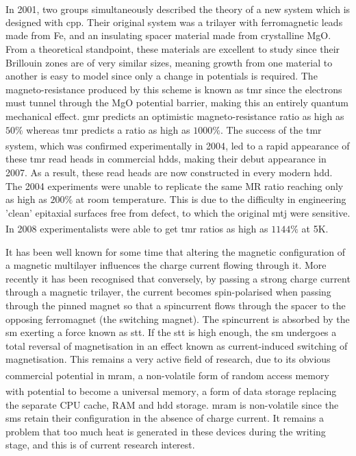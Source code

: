\documentclass[a4paper, 12pt]{article}
\newcommand{\site}[1]{\textsuperscript{\textcolor{blue}{\cite{#1}}}}
\begin{document}
	\\\par In 2001, two groups simultaneously described the theory of a new system\textsuperscript{\textcolor{blue}{\cite{tunnel1,tunnel2}}} which is designed with \gls{cpp}. Their original system was a trilayer with ferromagnetic leads made from Fe, and an insulating spacer material made from crystalline MgO. From a theoretical standpoint, these materials are excellent to study since their Brillouin zones are of very similar sizes, meaning growth from one material to another is easy to model since only a change in potentials is required. The magneto-resistance produced by this scheme is known as \gls{tmr} since the electrons must tunnel through the MgO potential barrier, making this an entirely quantum mechanical effect. \gls{gmr} predicts an optimistic magneto-resistance ratio as high as $50\%$ whereas \gls{tmr} predicts a ratio as high as $1000\%$.
	The success of the \gls{tmr} system, which was confirmed experimentally in 2004\textsuperscript{\textcolor{blue}{\cite{2004,2004P}}}, led to a rapid appearance of these \gls{tmr} read heads in commercial \gls{hdd}s, making their debut appearance in 2007. As a result, these read heads are now constructed in every modern \gls{hdd}. The 2004 experiments were unable to replicate the same MR ratio reaching only as high as $200\%$ at room temperature. This is due to the difficulty in engineering 'clean' epitaxial surfaces free from defect, to which the original \gls{mtj} were sensitive. In 2008 experimentalists were able to get \gls{tmr} ratios as high as $1144\%$ at 5K\textsuperscript{\textcolor{blue}{\cite{1100}}}.
	\\\par It has been well known for some time that altering the magnetic configuration of a magnetic multilayer influences the charge current flowing through it. More recently it has been recognised that conversely, by passing a strong charge current through a magnetic trilayer, the current becomes spin-polarised when passing through the pinned magnet so that a spincurrent flows through the spacer to the opposing ferromagnet (the switching magnet). The spincurrent is absorbed by the \gls{sm} exerting a force known as \gls{stt}. If the \gls{stt} is high enough, the \gls{sm} undergoes a total reversal of magnetisation in an effect known as current-induced switching of magnetisation. This remains a very active field of research, due to its obvious commercial potential in \gls{mram}\textsuperscript{\textcolor{blue}{\cite{stt}}}, a non-volatile form of random access memory with potential to become a universal memory\site{universal}, a form of data storage replacing the separate CPU cache, RAM and \gls{hdd} storage. \gls{mram} is non-volatile since the \gls{sm}s retain their configuration in the absence of charge current. It remains a problem that too much heat is generated in these devices during the writing stage, and this is of current research interest.
\end{document}
